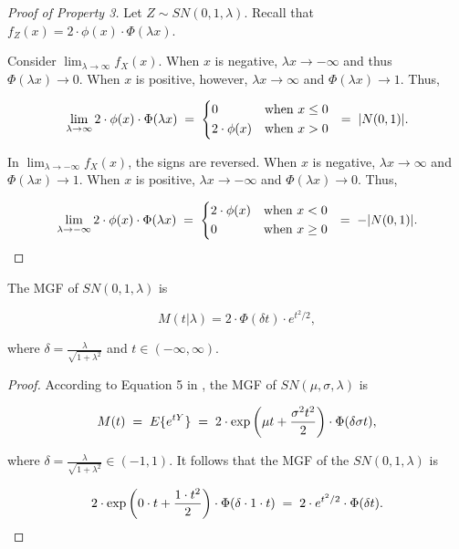 \documentclass{article}
\begin{document}
\begin{proof}[Proof of Property 3]
  Let $Z \sim SN(0,1,\lambda)$. Recall that $f_Z(x) = 2 \cdot \phi(x) \cdot
  \Phi(\lambda x)$.

  Consider $\lim_{\lambda \to \infty} f_X(x)$. When $x$ is negative, $\lambda x
  \to -\infty$ and thus $\Phi(\lambda x) \to 0$. When $x$ is positive, however,
  $\lambda x \to \infty$ and $\Phi(\lambda x) \to 1$. Thus,

  \begin{equation}
    \label{eq:p2-positive-half-normal}
    \lim_{\lambda \to \infty} 2 \cdot \phi(x) \cdot \Phi(\lambda x) \eq
    \begin{dcases*}
      0 & when $x \leq 0$ \\
      2 \cdot \phi(x) & when $x > 0$
    \end{dcases*}
    \eq |N(0,1)|.
  \end{equation}

  In $\lim_{\lambda \to -\infty} f_X(x)$, the signs are reversed. When $x$ is
  negative, $\lambda x \to \infty$ and $\Phi(\lambda x) \to 1$. When $x$ is
  positive, $\lambda x \to -\infty$ and $\Phi(\lambda x) \to 0$. Thus,

  \begin{equation}
    \label{eq:p2-negative-half-normal}
    \lim_{\lambda \to -\infty} 2 \cdot \phi(x) \cdot \Phi(\lambda x) \eq
    \begin{dcases*}
      2 \cdot \phi(x) & when $x < 0$ \\
      0 & when $x \geq 0$
    \end{dcases*}
    \eq -|N(0,1)|.
  \end{equation}
\end{proof}


\begin{property} \label{prop:4}
  The MGF of $SN(0,1,\lambda)$ is

  \begin{equation} \label{eq:p4-sn-mgf}
    M(t|\lambda) = 2 \cdot \Phi (\delta t) \cdot e^{t^2/2},
  \end{equation}
    
  where $\delta = \frac{\lambda}{\sqrt{1 + \lambda^2}}$ and $t \in (-\infty, \infty)$.
\end{property}

\begin{proof}
  According to Equation 5 in \citet{azzalini}, the MGF of $SN(\mu, \sigma,
  \lambda)$ is

  \begin{equation*}
    M(t) \;=\; E\{e^{tY}\} \;=\; 2 \cdot \exp \left( \mu t + \frac{\sigma^2 t^2}{2} \right) \cdot \Phi(\delta \sigma t),
  \end{equation*}

  where $\delta = \frac{\lambda}{\sqrt{1 + \lambda^2}} \in (-1, 1)$. It follows
  that the MGF of the $SN(0, 1, \lambda)$ is

  \begin{equation*}
    2 \cdot \exp \left( 0 \cdot t + \frac{1 \cdot t^2}{2} \right) \cdot \Phi(\delta \cdot 1 \cdot t) \;=\; 2 \cdot e^{t^2/2} \cdot \Phi(\delta t).
  \end{equation*}
\end{proof}
\end{document}
